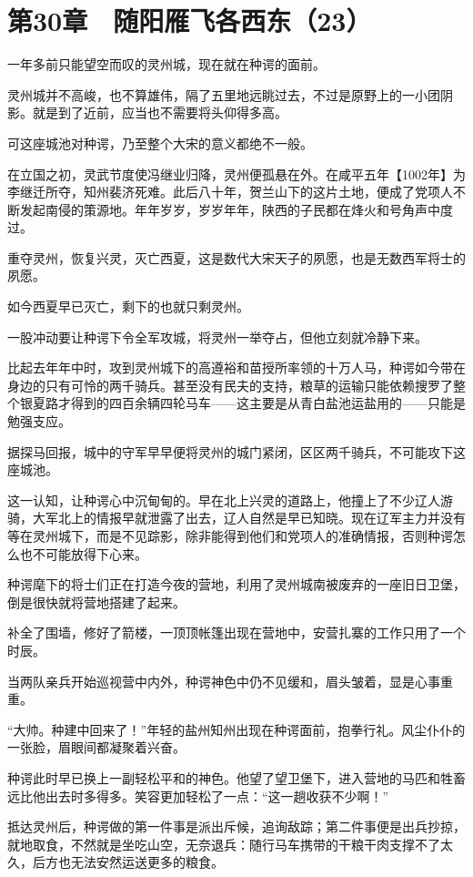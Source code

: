 \section{第30章　随阳雁飞各西东（23）}

一年多前只能望空而叹的灵州城，现在就在种谔的面前。

灵州城并不高峻，也不算雄伟，隔了五里地远眺过去，不过是原野上的一小团阴影。就是到了近前，应当也不需要将头仰得多高。

可这座城池对种谔，乃至整个大宋的意义都绝不一般。

在立国之初，灵武节度使冯继业归降，灵州便孤悬在外。在咸平五年【1002年】为李继迁所夺，知州裴济死难。此后八十年，贺兰山下的这片土地，便成了党项人不断发起南侵的策源地。年年岁岁，岁岁年年，陕西的子民都在烽火和号角声中度过。

重夺灵州，恢复兴灵，灭亡西夏，这是数代大宋天子的夙愿，也是无数西军将士的夙愿。

如今西夏早已灭亡，剩下的也就只剩灵州。

一股冲动要让种谔下令全军攻城，将灵州一举夺占，但他立刻就冷静下来。

比起去年年中时，攻到灵州城下的高遵裕和苗授所率领的十万人马，种谔如今带在身边的只有可怜的两千骑兵。甚至没有民夫的支持，粮草的运输只能依赖搜罗了整个银夏路才得到的四百余辆四轮马车——这主要是从青白盐池运盐用的——只能是勉强支应。

据探马回报，城中的守军早早便将灵州的城门紧闭，区区两千骑兵，不可能攻下这座城池。

这一认知，让种谔心中沉甸甸的。早在北上兴灵的道路上，他撞上了不少辽人游骑，大军北上的情报早就泄露了出去，辽人自然是早已知晓。现在辽军主力并没有等在灵州城下，而是不见踪影，除非能得到他们和党项人的准确情报，否则种谔怎么也不可能放得下心来。

种谔麾下的将士们正在打造今夜的营地，利用了灵州城南被废弃的一座旧日卫堡，倒是很快就将营地搭建了起来。

补全了围墙，修好了箭楼，一顶顶帐篷出现在营地中，安营扎寨的工作只用了一个时辰。

当两队亲兵开始巡视营中内外，种谔神色中仍不见缓和，眉头皱着，显是心事重重。

“大帅。种建中回来了！”年轻的盐州知州出现在种谔面前，抱拳行礼。风尘仆仆的一张脸，眉眼间都凝聚着兴奋。

种谔此时早已换上一副轻松平和的神色。他望了望卫堡下，进入营地的马匹和牲畜远比他出去时多得多。笑容更加轻松了一点：“这一趟收获不少啊！”

抵达灵州后，种谔做的第一件事是派出斥候，追询敌踪；第二件事便是出兵抄掠，就地取食，不然就是坐吃山空，无奈退兵：随行马车携带的干粮干肉支撑不了太久，后方也无法安然运送更多的粮食。

